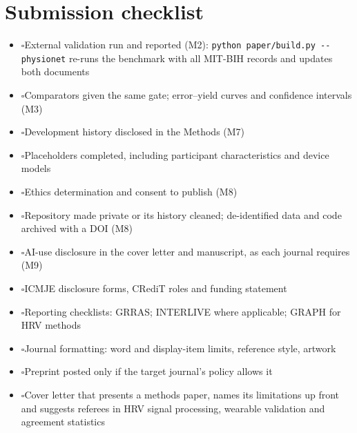 \documentclass[11pt,a4paper]{article}
\newcommand{\cmd}[1]{\texttt{\small #1}}
\newcommand{\chk}{$\square$\enspace}
\begin{document}
\section{Submission checklist}
\begin{itemize}[label={}, leftmargin=0.4em]
\item \chk External validation run and reported (M2): \cmd{python paper/build.py -{}-physionet} re-runs the benchmark with all MIT-BIH records and updates both documents
\item \chk Comparators given the same gate; error--yield curves and confidence intervals (M3)
\item \chk Development history disclosed in the Methods (M7)
\item \chk Placeholders completed, including participant characteristics and device models
\item \chk Ethics determination and consent to publish (M8)
\item \chk Repository made private or its history cleaned; de-identified data and code archived with a DOI (M8)
\item \chk AI-use disclosure in the cover letter and manuscript, as each journal requires (M9)
\item \chk ICMJE disclosure forms, CRediT roles and funding statement
\item \chk Reporting checklists: GRRAS; INTERLIVE where applicable; GRAPH for HRV methods\autocite{kottner2011,muhlen2021,quintana2016}
\item \chk Journal formatting: word and display-item limits, reference style, artwork
\item \chk Preprint posted only if the target journal's policy allows it
\item \chk Cover letter that presents a methods paper, names its limitations up front and suggests referees in HRV signal processing, wearable validation and agreement statistics
\end{itemize}
\end{document}
